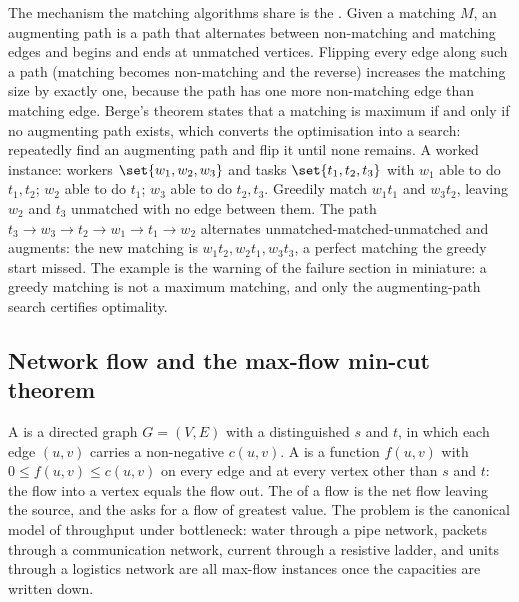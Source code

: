 The mechanism the matching algorithms share is the
. Given a matching $M$, an augmenting path
is a path that alternates between non-matching and matching edges and
begins and ends at unmatched vertices. Flipping every edge along
such a path (matching becomes non-matching and the reverse)
increases the matching size by exactly one, because the path has one
more non-matching edge than matching edge. Berge's theorem states
that a matching is maximum if and only if no augmenting path exists,
which converts the optimisation into a search: repeatedly find an
augmenting path and flip it until none remains. A worked instance:
workers $\set{w_{1}, w_{2}, w_{3}}$ and tasks $\set{t_{1}, t_{2},
t_{3}}$ with $w_{1}$ able to do $t_{1}, t_{2}$; $w_{2}$ able to do
$t_{1}$; $w_{3}$ able to do $t_{2}, t_{3}$. Greedily match $w_{1}
t_{1}$ and $w_{3} t_{2}$, leaving $w_{2}$ and $t_{3}$ unmatched with
no edge between them. The path $t_{3} \to w_{3} \to t_{2} \to w_{1}
\to t_{1} \to w_{2}$ alternates unmatched-matched-unmatched and
augments: the new matching is $w_{1} t_{2}, w_{2} t_{1}, w_{3}
t_{3}$, a perfect matching the greedy start missed. The example is
the warning of the failure section in miniature: a greedy matching
is not a maximum matching, and only the augmenting-path search
certifies optimality.



\subsection{Network flow and the max-flow min-cut theorem}

A  is a directed graph $G = (V, E)$ with a
distinguished  $s$ and  $t$, in which
each edge $(u, v)$ carries a non-negative  $c(u,
v)$. A  is a function $f(u, v)$ with $0 \leq f(u, v)
\leq c(u, v)$ on every edge and  at every
vertex other than $s$ and $t$: the flow into a vertex equals the
flow out. The  of a flow is the net flow leaving the
source, and the  asks for a flow of
greatest value. The problem is the canonical model of throughput
under bottleneck: water through a pipe network, packets through a
communication network, current through a resistive ladder, and units
through a logistics network are all max-flow instances once the
capacities are written down.

